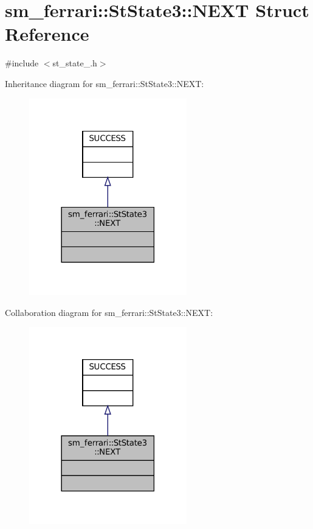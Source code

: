 \hypertarget{structsm__ferrari_1_1StState3_1_1NEXT}{}\section{sm\+\_\+ferrari\+:\+:St\+State3\+:\+:N\+E\+XT Struct Reference}
\label{structsm__ferrari_1_1StState3_1_1NEXT}


{\ttfamily \#include $<$st\+\_\+state\+\_.\+h$>$}



Inheritance diagram for sm\+\_\+ferrari\+:\+:St\+State3\+:\+:N\+E\+XT\+:
\nopagebreak
\begin{figure}[H]
\begin{center}
\leavevmode
\includegraphics[width=194pt]{structsm__ferrari_1_1StState3_1_1NEXT__inherit__graph}
\end{center}
\end{figure}


Collaboration diagram for sm\+\_\+ferrari\+:\+:St\+State3\+:\+:N\+E\+XT\+:
\nopagebreak
\begin{figure}[H]
\begin{center}
\leavevmode
\includegraphics[width=194pt]{structsm__ferrari_1_1StState3_1_1NEXT__coll__graph}
\end{center}
\end{figure}


